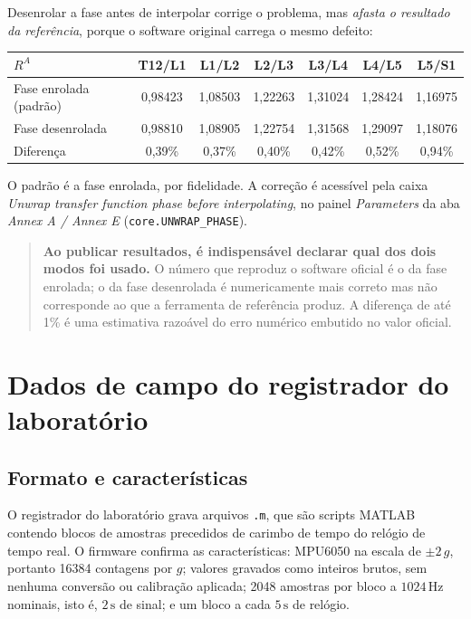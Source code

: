 \documentclass[11pt,a4paper]{article}
\newcommand{\code}[1]{\texttt{\small #1}}
\newcommand{\unit}[2]{\ensuremath{#1\,\mathrm{#2}}}
\begin{document}
Desenrolar a fase antes de interpolar corrige o problema, mas \emph{afasta o
resultado da referência}, porque o software original carrega o mesmo defeito:

\begin{center}
\begin{tabular}{lcccccc}
\toprule
$R^A$ & T12/L1 & L1/L2 & L2/L3 & L3/L4 & L4/L5 & L5/S1 \\
\midrule
Fase enrolada (padrão) & 0,98423 & 1,08503 & 1,22263 & 1,31024 & 1,28424 & 1,16975 \\
Fase desenrolada       & 0,98810 & 1,08905 & 1,22754 & 1,31568 & 1,29097 & 1,18076 \\
Diferença              & 0,39\% & 0,37\% & 0,40\% & 0,42\% & 0,52\% & 0,94\% \\
\bottomrule
\end{tabular}
\end{center}

O padrão é a fase enrolada, por fidelidade. A correção é acessível pela caixa
\emph{Unwrap transfer function phase before interpolating}, no painel
\emph{Parameters} da aba \emph{Annex A / Annex E} (\code{core.UNWRAP\_PHASE}).

\begin{quote}
\textbf{Ao publicar resultados, é indispensável declarar qual dos dois modos foi
usado.} O número que reproduz o software oficial é o da fase enrolada; o da fase
desenrolada é numericamente mais correto mas não corresponde ao que a ferramenta
de referência produz. A diferença de até 1\% é uma estimativa razoável do erro
numérico embutido no valor oficial.
\end{quote}

\section{Dados de campo do registrador do laboratório}
\label{sec:campo}

\subsection{Formato e características}

O registrador do laboratório grava arquivos \code{.m}, que são scripts MATLAB
contendo blocos de amostras precedidos de carimbo de tempo do relógio de tempo
real. O firmware confirma as características: MPU6050 na escala de $\pm 2\,g$,
portanto 16384 contagens por $g$; valores gravados como inteiros brutos, sem
nenhuma conversão ou calibração aplicada; 2048 amostras por bloco a
\unit{1024}{Hz} nominais, isto é, \unit{2}{s} de sinal; e um bloco a cada
\unit{5}{s} de relógio.
\end{document}
